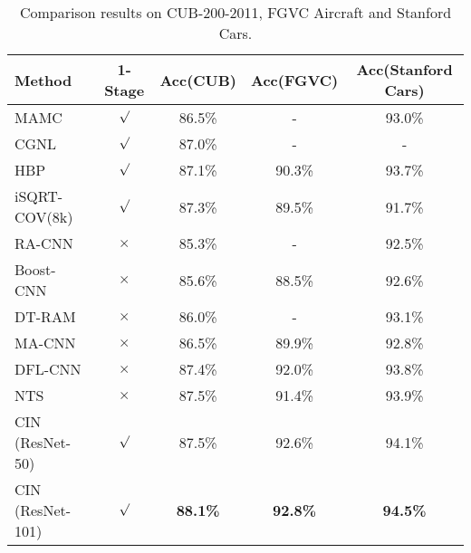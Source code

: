 \documentclass[letterpaper]{article} \usepackage{aaai20}  \usepackage{times}  \usepackage{helvet} \usepackage{courier}  \usepackage[hyphens]{url}  \usepackage{graphicx} \urlstyle{rm} \def\UrlFont{\rm}  \usepackage{graphicx}  \frenchspacing  \setlength{\pdfpagewidth}{8.5in}  \setlength{\pdfpageheight}{11in}  \usepackage{amsmath,amssymb}
\begin{document}
\begin{table*}[t]
\begin{center}
\begin{tabular}{|l|c|c|c|c|}
\hline
Method  & 1-Stage & Acc(CUB)  & Acc(FGVC) & Acc(Stanford Cars)\\
\hline\hline
MAMC~\cite{DBLP:conf/eccv/SunYZD18} & $\surd$ & 86.5\% & - & 93.0\%\\
CGNL~\cite{yu2018hierarchical}  & $\surd$ & 87.0\%& - & - \\
HBP~\cite{yu2018hierarchical}  & $\surd$ & 87.1\%& 90.3\% & 93.7\%\\
iSQRT-COV(8k)~\cite{DBLP:conf/cvpr/LiXWG18} & $\surd$ & 87.3\% & 89.5\% & 91.7\%\\
RA-CNN~\cite{fu2017look}  & $\times$ & 85.3\% & - & 92.5\%\\
Boost-CNN~\cite{DBLP:conf/bmvc/MoghimiBSYVL16}  & $\times$ & 85.6\% & 88.5\% & 92.6\%\\
DT-RAM~\cite{li2017dynamic} & $\times$ & 86.0\% & - & 93.1\%\\
MA-CNN~\cite{zheng2017learning}& $\times$ & 86.5\% & 89.9\% & 92.8\%\\
DFL-CNN~\cite{wang2018learning} & $\times$ & 87.4\% & 92.0\% & 93.8\%\\
NTS~\cite{yang2018learning} & $\times$ & 87.5\% & 91.4\% & 93.9\%\\
\hline
CIN (ResNet-50) & $\surd$ & 87.5\% & 92.6\% & 94.1\%\\
CIN (ResNet-101) & $\surd$ & \textbf{88.1\%} & \textbf{92.8\%}& \textbf{94.5\%}\\
\hline
\end{tabular}
\end{center}
\caption{Comparison results on CUB-200-2011, FGVC Aircraft and Stanford Cars.}
\label{tab:cub}
\end{table*}
\end{document}
